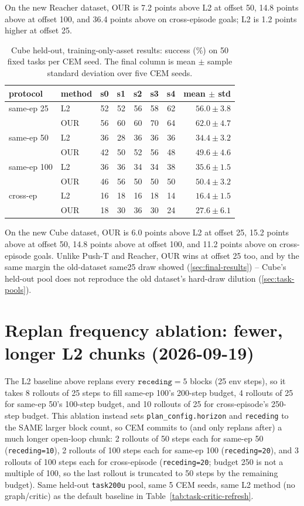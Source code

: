 \documentclass[11pt]{article}
\begin{document}
On the new Reacher dataset, OUR is 7.2 points above L2 at offset 50, 14.8 points above at
offset 100, and 36.4 points above on cross-episode goals; L2 is 1.2 points higher at offset
25.

\begin{table}[t]
\centering
\small
\caption{Cube held-out, training-only-asset results: success (\%) on 50 fixed tasks per
CEM seed. The final column is mean $\pm$ sample standard deviation over five CEM seeds.}
\label{tab:cube-task-critic-refresh}
\begin{tabular}{llrrrrrr}
\toprule
protocol & method & s0 & s1 & s2 & s3 & s4 & mean $\pm$ std \\
\midrule
same-ep 25 & L2 & 52 & 52 & 56 & 58 & 62 & $56.0 \pm 3.8$ \\
           & OUR & 56 & 60 & 60 & 70 & 64 & $62.0 \pm 4.7$ \\
\midrule
same-ep 50 & L2 & 36 & 28 & 36 & 36 & 36 & $34.4 \pm 3.2$ \\
           & OUR & 42 & 50 & 52 & 56 & 48 & $49.6 \pm 4.6$ \\
\midrule
same-ep 100 & L2 & 36 & 36 & 34 & 34 & 38 & $35.6 \pm 1.5$ \\
            & OUR & 46 & 56 & 50 & 50 & 50 & $50.4 \pm 3.2$ \\
\midrule
cross-ep & L2 & 16 & 18 & 16 & 18 & 14 & $16.4 \pm 1.5$ \\
         & OUR & 18 & 30 & 36 & 30 & 24 & $27.6 \pm 6.1$ \\
\bottomrule
\end{tabular}
\end{table}

On the new Cube dataset, OUR is 6.0 points above L2 at offset 25, 15.2 points above at
offset 50, 14.8 points above at offset 100, and 11.2 points above on cross-episode goals.
Unlike Push-T and Reacher, OUR wins at offset 25 too, and by the same margin the old-dataset
same25 draw showed (\cref{sec:final-results}) -- Cube's held-out pool does not reproduce the
old dataset's hard-draw dilution (\cref{sec:task-pools}).

\section{Replan frequency ablation: fewer, longer L2 chunks (2026-09-19)}
\label{sec:replan-frequency}
The L2 baseline above replans every $\texttt{receding}=5$ blocks (25 env steps), so it takes
8 rollouts of 25 steps to fill same-ep 100's 200-step budget, 4 rollouts of 25 for same-ep
50's 100-step budget, and 10 rollouts of 25 for cross-episode's 250-step budget. This
ablation instead sets \texttt{plan\_config.horizon} and \texttt{receding} to the SAME larger
block count, so CEM commits to (and only replans after) a much longer open-loop chunk: 2
rollouts of 50 steps each for same-ep 50 (\texttt{receding=10}), 2 rollouts of 100 steps each
for same-ep 100 (\texttt{receding=20}), and 3 rollouts of 100 steps each for cross-episode
(\texttt{receding=20}; budget 250 is not a multiple of 100, so the last rollout is truncated
to 50 steps by the remaining budget). Same held-out \texttt{task200u} pool, same 5 CEM seeds,
same L2 method (no graph/critic) as the default baseline in Table~\ref{tab:task-critic-refresh}.
\end{document}
